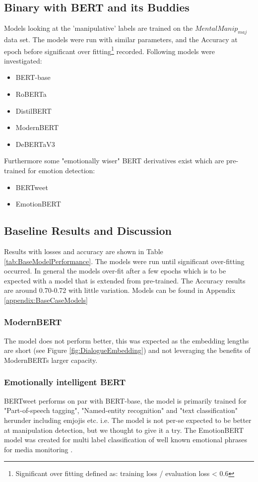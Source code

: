\documentclass[
	letterpaper, %
	12pt, %
	unnumberedsections, %
	twoside, %
]{LTJournalArticle}
\begin{document}
\subsection{Binary with BERT and its Buddies}
Models looking at the 'manipulative' labels are trained on the $MentalManip_{maj}$ data set. The models were run with similar parameters, and the Accuracy at epoch before significant over fitting\footnote{Significant over fitting defined as: training loss / evaluation loss < 0.6} recorded. Following models were investigated:
\begin{itemize}
	\item BERT-base \cite{BERT-base}
	\item RoBERTa \cite{RoBERTa}
	\item DistilBERT \cite{DistilBERT}
	\item ModernBERT \cite{ModernBERT}
	\item DeBERTaV3 \cite{DeBERTaV3}
\end{itemize}
Furthermore some "emotionally wiser" BERT derivatives exist which are pre-trained for emotion detection:
\begin{itemize}
	\item BERTweet \cite{BERTweet}
	\item EmotionBERT \cite{EmotionBERT}
\end{itemize}

\subsection{Baseline Results and Discussion}\label{sec:BaselineResults}
Results with losses and accuracy are shown in Table \ref{tab:BaseModelPerformance}. The models were run until significant over-fitting occurred. In general the models over-fit after a few epochs which is to be expected with a model that is extended from pre-trained. The Accuracy results are around 0.70-0.72 with little variation. Models can be found in Appendix \ref{appendix:BaseCaseModels}

\subsubsection{ModernBERT} The model does not perform better, this was expected as the embedding lengths are short (see Figure \ref{fig:DialogueEmbedding}) and not leveraging the benefits of ModernBERTs larger capacity.

\subsubsection{Emotionally intelligent BERT}
BERTweet performs on par with BERT-base, the model is primarily trained for "Part-of-speech tagging", "Named-entity recognition" and "text classification" \cite{BERTweet} herunder including emjojis etc. i.e. The model is not per-se expected to be better at manipulation detection, but we thought to give it a try. The EmotionBERT model was created for multi label classification of well known emotional phrases for media monitoring \cite{EmotionBERT}.
\end{document}
